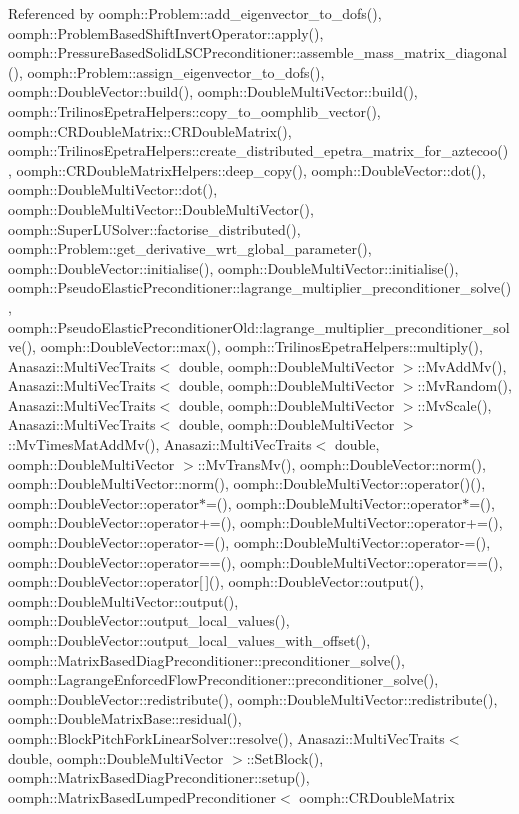 Referenced by oomph\+::\+Problem\+::add\+\_\+eigenvector\+\_\+to\+\_\+dofs(), oomph\+::\+Problem\+Based\+Shift\+Invert\+Operator\+::apply(), oomph\+::\+Pressure\+Based\+Solid\+L\+S\+C\+Preconditioner\+::assemble\+\_\+mass\+\_\+matrix\+\_\+diagonal(), oomph\+::\+Problem\+::assign\+\_\+eigenvector\+\_\+to\+\_\+dofs(), oomph\+::\+Double\+Vector\+::build(), oomph\+::\+Double\+Multi\+Vector\+::build(), oomph\+::\+Trilinos\+Epetra\+Helpers\+::copy\+\_\+to\+\_\+oomphlib\+\_\+vector(), oomph\+::\+C\+R\+Double\+Matrix\+::\+C\+R\+Double\+Matrix(), oomph\+::\+Trilinos\+Epetra\+Helpers\+::create\+\_\+distributed\+\_\+epetra\+\_\+matrix\+\_\+for\+\_\+aztecoo(), oomph\+::\+C\+R\+Double\+Matrix\+Helpers\+::deep\+\_\+copy(), oomph\+::\+Double\+Vector\+::dot(), oomph\+::\+Double\+Multi\+Vector\+::dot(), oomph\+::\+Double\+Multi\+Vector\+::\+Double\+Multi\+Vector(), oomph\+::\+Super\+L\+U\+Solver\+::factorise\+\_\+distributed(), oomph\+::\+Problem\+::get\+\_\+derivative\+\_\+wrt\+\_\+global\+\_\+parameter(), oomph\+::\+Double\+Vector\+::initialise(), oomph\+::\+Double\+Multi\+Vector\+::initialise(), oomph\+::\+Pseudo\+Elastic\+Preconditioner\+::lagrange\+\_\+multiplier\+\_\+preconditioner\+\_\+solve(), oomph\+::\+Pseudo\+Elastic\+Preconditioner\+Old\+::lagrange\+\_\+multiplier\+\_\+preconditioner\+\_\+solve(), oomph\+::\+Double\+Vector\+::max(), oomph\+::\+Trilinos\+Epetra\+Helpers\+::multiply(), Anasazi\+::\+Multi\+Vec\+Traits$<$ double, oomph\+::\+Double\+Multi\+Vector $>$\+::\+Mv\+Add\+Mv(), Anasazi\+::\+Multi\+Vec\+Traits$<$ double, oomph\+::\+Double\+Multi\+Vector $>$\+::\+Mv\+Random(), Anasazi\+::\+Multi\+Vec\+Traits$<$ double, oomph\+::\+Double\+Multi\+Vector $>$\+::\+Mv\+Scale(), Anasazi\+::\+Multi\+Vec\+Traits$<$ double, oomph\+::\+Double\+Multi\+Vector $>$\+::\+Mv\+Times\+Mat\+Add\+Mv(), Anasazi\+::\+Multi\+Vec\+Traits$<$ double, oomph\+::\+Double\+Multi\+Vector $>$\+::\+Mv\+Trans\+Mv(), oomph\+::\+Double\+Vector\+::norm(), oomph\+::\+Double\+Multi\+Vector\+::norm(), oomph\+::\+Double\+Multi\+Vector\+::operator()(), oomph\+::\+Double\+Vector\+::operator$\ast$=(), oomph\+::\+Double\+Multi\+Vector\+::operator$\ast$=(), oomph\+::\+Double\+Vector\+::operator+=(), oomph\+::\+Double\+Multi\+Vector\+::operator+=(), oomph\+::\+Double\+Vector\+::operator-\/=(), oomph\+::\+Double\+Multi\+Vector\+::operator-\/=(), oomph\+::\+Double\+Vector\+::operator==(), oomph\+::\+Double\+Multi\+Vector\+::operator==(), oomph\+::\+Double\+Vector\+::operator\mbox{[}$\,$\mbox{]}(), oomph\+::\+Double\+Vector\+::output(), oomph\+::\+Double\+Multi\+Vector\+::output(), oomph\+::\+Double\+Vector\+::output\+\_\+local\+\_\+values(), oomph\+::\+Double\+Vector\+::output\+\_\+local\+\_\+values\+\_\+with\+\_\+offset(), oomph\+::\+Matrix\+Based\+Diag\+Preconditioner\+::preconditioner\+\_\+solve(), oomph\+::\+Lagrange\+Enforced\+Flow\+Preconditioner\+::preconditioner\+\_\+solve(), oomph\+::\+Double\+Vector\+::redistribute(), oomph\+::\+Double\+Multi\+Vector\+::redistribute(), oomph\+::\+Double\+Matrix\+Base\+::residual(), oomph\+::\+Block\+Pitch\+Fork\+Linear\+Solver\+::resolve(), Anasazi\+::\+Multi\+Vec\+Traits$<$ double, oomph\+::\+Double\+Multi\+Vector $>$\+::\+Set\+Block(), oomph\+::\+Matrix\+Based\+Diag\+Preconditioner\+::setup(), oomph\+::\+Matrix\+Based\+Lumped\+Preconditioner$<$ oomph\+::\+C\+R\+Double\+Matrix 